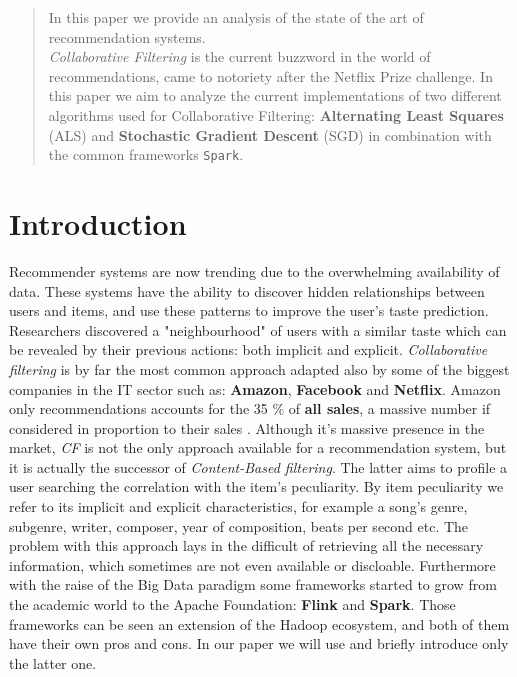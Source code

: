 \documentclass{sig-alternate-05-2015}
\begin{document}

\maketitle
\begin{abstract}

In this paper we provide an analysis of the state of the
art of recommendation systems.\\
\textit{Collaborative Filtering} is the current buzzword in the
world of recommendations, came to notoriety after the Netflix Prize
challenge. In this paper we aim to analyze the current implementations
of two different algorithms used for Collaborative Filtering: \textbf{Alternating Least Squares} (ALS) and \textbf{Stochastic
Gradient Descent} (SGD) in combination with the common frameworks \texttt{Spark}.
\end{abstract}





\section{Introduction}
Recommender systems are now trending due to the overwhelming availability
of data. These systems have the ability to discover hidden relationships between
users and items, and use these patterns to improve the user's taste prediction.
Researchers discovered a "neighbourhood" of users with a similar taste
which can be revealed by their previous actions: both implicit and explicit.
\textit{Collaborative filtering} is by far the most common approach adapted also by
some of the biggest companies in the IT sector such as: \textbf{Amazon}, \textbf{Facebook} and \textbf{Netflix}.
Amazon only recommendations accounts for the 35 \% of  \textbf{all sales}, a massive
number if considered in proportion to their sales \cite{quora:collaborative-sales}.
Although it's massive presence in the market, \textit{CF} is not the only approach
available for a recommendation system, but it is actually the successor of
\textit{Content-Based filtering}. The latter aims to profile a user searching
the correlation with the item's peculiarity. By item peculiarity we refer to
its implicit and explicit characteristics, for example a song's genre,
subgenre, writer, composer, year of composition, beats per second etc.
The problem with this approach lays in the difficult of retrieving all the necessary
information, which sometimes are not even available or discloable.
Furthermore with the raise of the Big Data paradigm some frameworks started to grow from
the academic world to the Apache Foundation: \textbf{Flink} and \textbf{Spark}.
Those frameworks can be seen an extension of the Hadoop ecosystem, and both of them
have their own pros and cons. In our paper we will use and briefly introduce only
the latter one.
\end{document}
